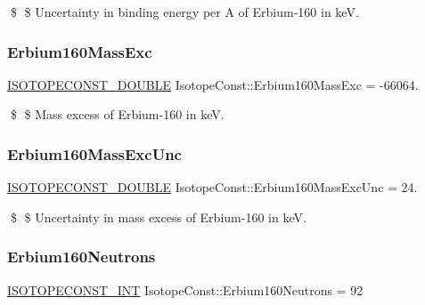 \$ \$ Uncertainty in binding energy per A of Erbium-\/160 in keV. \mbox{\label{group___isotope_const-_erbium-_er160_ga1c1b4956d1cc6ea6e8c0c8324f713589}} 
\subsubsection{\texorpdfstring{Erbium160\+Mass\+Exc}{Erbium160MassExc}}
{\footnotesize\ttfamily \mbox{\hyperlink{group___isotope_const-_macros_ga8f45a7272ce02c0b4c65c44636ed719a}{I\+S\+O\+T\+O\+P\+E\+C\+O\+N\+S\+T\+\_\+\+D\+O\+U\+B\+LE}} Isotope\+Const\+::\+Erbium160\+Mass\+Exc = -\/66064.}

\$ \$ Mass excess of Erbium-\/160 in keV. \mbox{\label{group___isotope_const-_erbium-_er160_ga477dacddd921ac6e24e524122ecc1d7e}} 
\subsubsection{\texorpdfstring{Erbium160\+Mass\+Exc\+Unc}{Erbium160MassExcUnc}}
{\footnotesize\ttfamily \mbox{\hyperlink{group___isotope_const-_macros_ga8f45a7272ce02c0b4c65c44636ed719a}{I\+S\+O\+T\+O\+P\+E\+C\+O\+N\+S\+T\+\_\+\+D\+O\+U\+B\+LE}} Isotope\+Const\+::\+Erbium160\+Mass\+Exc\+Unc = 24.}

\$ \$ Uncertainty in mass excess of Erbium-\/160 in keV. \mbox{\label{group___isotope_const-_erbium-_er160_ga1663c3917f864264e247655ed1f6f024}} 
\subsubsection{\texorpdfstring{Erbium160\+Neutrons}{Erbium160Neutrons}}
{\footnotesize\ttfamily \mbox{\hyperlink{group___isotope_const-_macros_ga5f18360b3e99483a35c32d789e62621c}{I\+S\+O\+T\+O\+P\+E\+C\+O\+N\+S\+T\+\_\+\+I\+NT}} Isotope\+Const\+::\+Erbium160\+Neutrons = 92}

